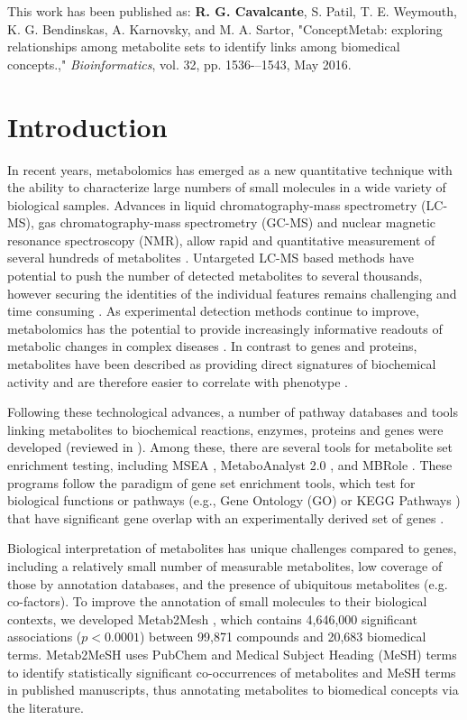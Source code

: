 \noindent This work has been published as: \textbf{R. G. Cavalcante}, S. Patil, T. E. Weymouth, K. G. Bendinskas, A. Karnovsky, and M. A. Sartor, "ConceptMetab: exploring relationships among metabolite sets to identify links among biomedical concepts.," \emph{Bioinformatics}, vol. 32, pp. 1536-–1543, May 2016.

\section{Introduction}
\label{conceptmetab_introduction}

In recent years, metabolomics has emerged as a new quantitative technique with the ability to characterize large numbers of small molecules in a wide variety of biological samples. Advances in liquid chromatography-mass spectrometry (LC-MS), gas chromatography-mass spectrometry (GC-MS) and nuclear magnetic resonance spectroscopy (NMR), allow rapid and quantitative measurement of several hundreds of metabolites \cite{Jonsson:2004bo, Wishart:2011kd}. Untargeted LC-MS based methods have potential to push the number of detected metabolites to several thousands, however securing the identities of the individual features remains challenging and time consuming \cite{Baker:2011fd}. As experimental detection methods continue to improve, metabolomics has the potential to provide increasingly informative readouts of metabolic changes in complex diseases \cite{Sreekumar:2009bk, Urayama:2010du, Wang:2011bz, Wisloff:2005iy, Yap:2010cv}. In contrast to genes and proteins, metabolites have been described as providing direct signatures of biochemical activity and are therefore easier to correlate with phenotype \cite{Patti:2012ek}.

Following these technological advances, a number of pathway databases and tools linking metabolites to biochemical reactions, enzymes, proteins and genes were developed (reviewed in \cite{Sas:2015go}). Among these, there are several tools for metabolite set enrichment testing, including MSEA \cite{Xia:2010fv}, MetaboAnalyst 2.0 \cite{Xia:2012fs}, and MBRole \cite{Chagoyen:2011bl}. These programs follow the paradigm of gene set enrichment tools, which test for biological functions or pathways (e.g., Gene Ontology (GO) \cite{Harris:2004kt} or KEGG Pathways \cite{Kanehisa:2011fz}) that have significant gene overlap with an experimentally derived set of genes \cite{Khatri:2012fy}.

Biological interpretation of metabolites has unique challenges compared to genes, including a relatively small number of measurable metabolites, low coverage of those by annotation databases, and the presence of ubiquitous metabolites (e.g. co-factors). To improve the annotation of small molecules to their biological contexts, we developed Metab2Mesh \cite{Sartor:2012eb}, which contains 4,646,000 significant associations ($p < 0.0001$) between 99,871 compounds and 20,683 biomedical terms. Metab2MeSH uses PubChem and Medical Subject Heading (MeSH) terms to identify statistically significant co-occurrences of metabolites and MeSH terms in published manuscripts, thus annotating metabolites to biomedical concepts via the literature.

